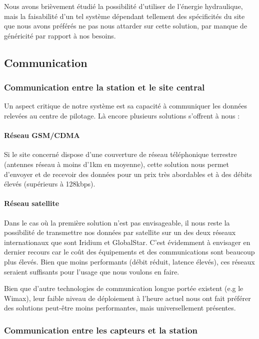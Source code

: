 Nous avons brièvement étudié la possibilité d'utiliser de l'énergie hydraulique, mais la faisabilité d'un tel système dépendant tellement des spécificités du site que nous avons préférés ne pas nous attarder sur cette solution, par manque de généricité par rapport à nos besoins.

\subsection{Communication}

\subsubsection{Communication entre la station et le site central}

Un aspect critique de notre système est sa capacité à communiquer les données relevées au centre de pilotage. Là encore plusieurs solutions s'offrent à nous :

\paragraph{Réseau GSM/CDMA}

Si le site concerné dispose d'une couverture de réseau téléphonique terrestre (antennes réseau à moins d'1km en moyenne), cette solution nous permet d'envoyer et de recevoir des données pour un prix très abordables et à des débits élevés (supérieurs à 128kbps).

\paragraph{Réseau satellite}

Dans le cas où la première solution n'est pas envisageable, il nous reste la possibilité de transmettre nos données par satellite sur un des deux réseaux internationaux que sont Iridium et GlobalStar. C'est évidemment à envisager en dernier recours car le coût des équipements et des communications sont beaucoup plus élevés. Bien que moins performants (débit réduit, latence élevés), ces réseaux seraient suffisants pour l'usage que nous voulons en faire.

Bien que d'autre technologies de communication longue portée existent (e.g le Wimax), leur faible niveau de déploiement à l'heure actuel nous ont fait préférer des solutions peut-être moins performantes, mais universellement présentes.

\subsubsection{Communication entre les capteurs et la station}

